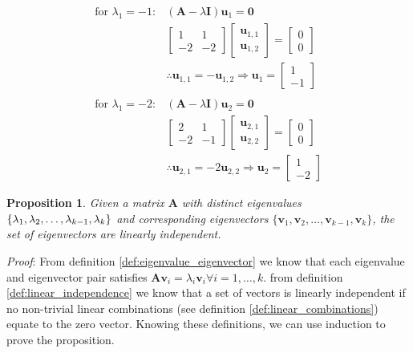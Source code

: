 \documentclass[a4paper,12pt]{book}
\newcommand{\matrx}[1]{\bm{#1}}
\newcommand{\vectr}[1]{\textbf{#1}}
\newcommand{\italic}[1]{\textit{#1}}
\newtheorem{proposition}{Proposition}[section]
\begin{document}
	\begin{align}
		\text{for } \lambda_1 = -1:&
		(\matrx{A} - \lambda \matrx{I}) \vectr{u}_1 = \vectr{0} \\
		& \begin{bmatrix}
			1 & 1 \\
			-2 & -2
		\end{bmatrix} \begin{bmatrix}
			\vectr{u}_{1,1} \\
			\vectr{u}_{1,2}
		\end{bmatrix} = \begin{bmatrix}
			0 \\
			0
		\end{bmatrix} \\
		&\therefore \vectr{u}_{1,1} = -\vectr{u}_{1,2} \Rightarrow \vectr{u}_1 = \begin{bmatrix}
			1 \\
			-1
		\end{bmatrix} \\ \\
		\text{for } \lambda_1 = -2:&
		(\matrx{A} - \lambda \matrx{I}) \vectr{u}_2 = \vectr{0} \\
		& \begin{bmatrix}
			2 & 1 \\
			-2 & -1
		\end{bmatrix} \begin{bmatrix}
			\vectr{u}_{2,1} \\
			\vectr{u}_{2,2}
		\end{bmatrix} = \begin{bmatrix}
			0 \\
			0
		\end{bmatrix} \\
		&\therefore \vectr{u}_{2,1} = -2 \vectr{u}_{2,2} \Rightarrow \vectr{u}_2 = \begin{bmatrix}
			1 \\
			-2
		\end{bmatrix}
	\end{align}
	\begin{proposition}
		\normalfont Given a matrix $ \matrx{A} $ with distinct eigenvalues $ \{\lambda_1,\lambda_2,\ldots \\,\lambda_{k - 1},\lambda_k\} $ and corresponding eigenvectors $ \{\vectr{v}_1,\vectr{v}_2,\ldots,\vectr{v}_{k - 1},\vectr{v}_k\} $, the set of eigenvectors are linearly independent.
		\label{prop:eigenvectors_linearly_independent}
	\end{proposition}
	\italic{Proof}: From definition \ref{def:eigenvalue_eigenvector} we know that each eigenvalue and eigenvector pair satisfies $ \matrx{A}\vectr{v}_i = \lambda_i \vectr{v}_i \forall i = 1,\ldots,k$. from definition \ref{def:linear_independence} we know that a set of vectors is linearly independent if no non-trivial linear combinations (see definition \ref{def:linear_combinations}) equate to the zero vector. Knowing these definitions, we can use induction to prove the proposition.
\end{document}
